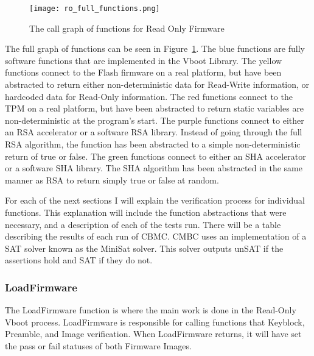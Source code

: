 \documentclass[../report.tex]{subfiles}
\begin{document}
\begin{figure}
  \centering
  \texttt{[image: ro\_full\_functions.png]}
  \caption{The call graph of functions for Read Only Firmware}\label{fig:full_functions}
\end{figure}

The full graph of functions can be seen in Figure~\ref{fig:full_functions}.
The blue functions are fully software functions that are implemented in the Vboot Library.
The yellow functions connect to the Flash firmware on a real platform, but have been abstracted to return either non-deterministic data for Read-Write information, or hardcoded data for Read-Only information.
The red functions connect to the TPM on a real platform, but have been abstracted to return static variables are non-deterministic at the program's start.
The purple functions connect to either an RSA accelerator or a software RSA library. Instead of going through the full RSA algorithm, the function has been abstracted to a simple non-deterministic return of true or false. 
The green functions connect to either an SHA accelerator or a software SHA library.
The SHA algorithm has been abstracted in the same manner as RSA to return simply true or false at random.

For each of the next sections I will explain the verification process for individual functions. 
This explanation will include the function abstractions that were necessary, and a description of each of the tests run. 
There will be a table describing the results of each run of CBMC\@.
CMBC uses an implementation of a SAT solver known as the MiniSat solver\cite{minisat}.
This solver outputs unSAT if the assertions hold and SAT if they do not. 

\subsubsection{LoadFirmware}

The LoadFirmware function is where the main work is done in the Read-Only Vboot process.
LoadFirmware is responsible for calling functions that  Keyblock, Preamble, and Image verification.
When LoadFirmware returns, it will have set the pass or fail statuses of both Firmware Images.
\end{document}

